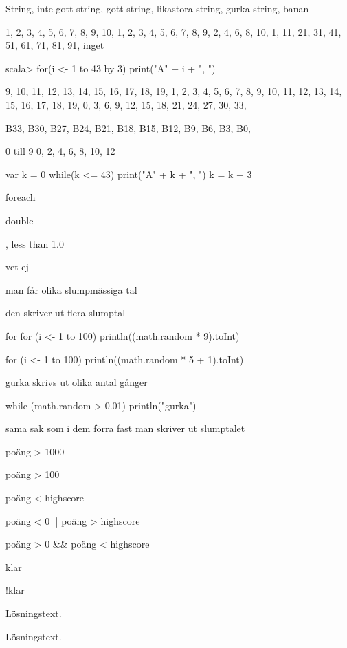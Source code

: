 \Subtask String, inte gott
\Subtask string, gott
\Subtask string, likastora
\Subtask string, gurka
\Subtask string, banan

\Task %

\Subtask 

1, 2, 3, 4, 5, 6, 7, 8, 9, 10,
1, 2, 3, 4, 5, 6, 7, 8, 9,
2, 4, 6, 8, 10,
1, 11, 21, 31, 41, 51, 61, 71, 81, 91,
inget

\Subtask 

scala> for(i <- 1 to 43 by 3) print("A" + i + ", ")

\Task %

\Subtask 

9, 10, 11, 12, 13, 14, 15, 16, 17, 18, 19,
1, 2, 3, 4, 5, 6, 7, 8, 9, 10, 11, 12, 13, 14, 15, 16, 17, 18, 19,
0, 3, 6, 9, 12, 15, 18, 21, 24, 27, 30, 33,

\Subtask 

B33, B30, B27, B24, B21, B18, B15, B12, B9, B6, B3, B0,

\Task %

\Subtask 

0 till 9
0, 2, 4, 6, 8, 10, 12

\Subtask 

var k = 0
while(k <= 43)
{
print("A" + k + ", ")
k = k + 3
}

\Subtask 

foreach

\Task %

\Subtask  double

, less than 1.0

\Subtask  vet ej

\Subtask man får olika slumpmässiga tal

\Subtask den skriver ut flera slumptal

\Subtask for for (i <- 1 to 100) println((math.random * 9).toInt)

\Subtask for (i <- 1 to 100) println((math.random * 5 + 1).toInt)

\Subtask  gurka skrivs ut olika antal gånger

\Subtask while (math.random > 0.01) println("gurka")

\Subtask  sama sak som i dem förra fast man skriver ut slumptalet

\Task %

\Subtask  poäng > 1000

\Subtask poäng > 100

\Subtask  poäng < highscore

\Subtask poäng < 0 || poäng > highscore 

\Subtask  poäng > 0 \&\& poäng < highscore

\Subtask  klar

\Subtask  !klar




\ExtraTasks %

\Task 

\Subtask 

\Subtask Lösningstext.


\AdvancedTasks %

\Task 

\Subtask {}

\Subtask Lösningstext.
